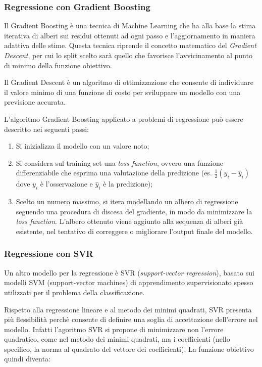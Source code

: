 \subsubsection{Regressione con Gradient Boosting}\label{sssec:regressione-gb}
Il Gradient Boosting è una tecnica di Machine Learning che ha alla base la stima iterativa di alberi sui residui ottenuti ad ogni passo e l’aggiornamento in maniera adattiva delle stime. Questa tecnica riprende il concetto matematico del \textit{Gradient Descent}, per cui lo split scelto sarà quello che favorisce l’avvicinamento al punto di minimo della funzione obiettivo.

Il Gradient Descent è un algoritmo di ottimizzazione che consente di individuare il valore minimo di una funzione di costo per sviluppare un modello con una previsione accurata.

L’algoritmo Gradient Boosting applicato a problemi di regressione può essere descritto nei seguenti passi:

\begin{enumerate}
  \item Si inizializza il modello con un valore noto;
  \item Si considera sul training set una \textit{loss function}, ovvero una funzione differenziabile che esprima una valutazione della predizione (es. $\frac{1}{2} (y_i - \hat{y}_{i})$ dove $y_i$ è l'osservazione e $\hat{y}_{i}$ è la predizione);
  \item Scelto un numero massimo, si itera modellando un albero di regressione seguendo una procedura di discesa del gradiente, in modo da minimizzare la \textit{loss function}. L'albero ottenuto viene aggiunto alla sequenza di alberi già esistente, nel tentativo di correggere o migliorare l'output finale del modello.
\end{enumerate}


\subsubsection{Regressione con SVR}\label{sssec:regressione-svr}
Un altro modello per la regressione è SVR (\textit{support-vector regression}), basato sui modelli SVM (support-vector machines) di apprendimento supervisionato spesso utilizzati per il problema della classificazione. \cite{svm}

Rispetto alla regressione lineare e al metodo dei minimi quadrati, SVR presenta più flessibilità perchè consente di definire una soglia di accettazione dell'errore nel modello. Infatti l'agoritmo SVR si propone di minimizzare non l'errore quadratico, come nel metodo dei minimi quadrati, ma i coefficienti (nello specifico, la norma al quadrato del vettore dei coefficienti). La funzione obiettivo quindi diventa:

